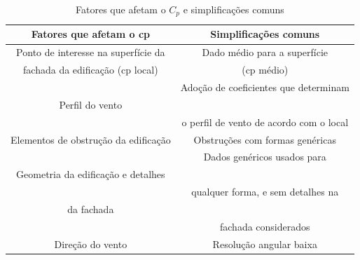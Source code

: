 \begin{table}[h]
	\caption{Fatores que afetam o $C_p$ e simplificações comuns}
	\label{tab:CpSimp}
	\centering
	\begin{tabular}{|c |c |} %
		\hline	
		\textbf{Fatores que afetam o \acrshort{cp}} & \textbf{Simplificações comuns} \\
		\hline
		Ponto de interesse na superfície da & Dado médio para a superfície \\
		fachada da edificação (\acrshort{cp} local) & (\acrshort{cp} médio)\\
		\hline
		{} & Adoção de coeficientes que determinam \vspace{-5pt}\\
		Perfil do vento & {} \vspace{-7pt}\\
		{} & o perfil de vento de acordo com o local \\
		\hline
		Elementos de obstrução da edificação & Obstruções com formas genéricas  \\
		\hline
		{} & Dados genéricos usados para \vspace{-5pt} \\
		Geometria da edificação e detalhes & {} \vspace{-7pt} \\
		{} & qualquer forma, e sem detalhes na \vspace{-5pt} \\
		da fachada & {} \vspace{-7pt} \\
		{} & fachada considerados \\
		\hline
		Direção do vento & Resolução angular baixa \\
		\hline
		
	\end{tabular}
\end{table}

